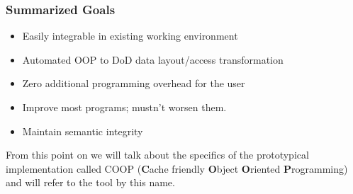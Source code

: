 \subsubsection{Summarized Goals}
\begin{itemize}
	\item Easily integrable in existing working environment
	\item Automated OOP to DoD data layout/access transformation
	\item Zero additional programming overhead for the user
	\item Improve most programs; mustn't worsen them.
	\item Maintain semantic integrity

\end{itemize}
From this point on we will talk about the specifics of the prototypical implementation called COOP (\textbf{C}ache friendly \textbf{O}bject \textbf{O}riented \textbf{P}rogramming) and will refer to the tool by this name.

